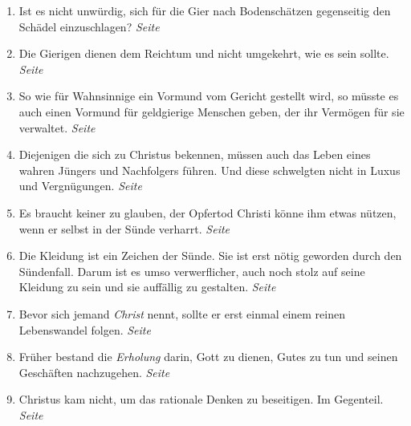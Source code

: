\begin{enumerate}
 \item Ist es nicht unwürdig, sich für die Gier nach Bodenschätzen
gegenseitig den Schädel einzuschlagen?
 \dotfill \textit{Seite~\pageref{ref:13_21_Kapitalisten_kritik}}\\

 \item Die Gierigen dienen dem Reichtum und nicht umgekehrt, wie es sein sollte.
 \dotfill \textit{Seite~\pageref{ref:13_21_Kapitalisten_dienerschaft}}\\

 \item So wie für Wahnsinnige ein Vormund vom Gericht gestellt wird, so
müsste es auch einen Vormund für geldgierige Menschen geben, der ihr Vermögen für
sie verwaltet.
 \dotfill \textit{Seite~\pageref{ref:13_22_wahnsinnige}}\\

 \item Diejenigen die sich zu Christus bekennen, müssen auch das Leben eines
wahren Jüngers und Nachfolgers führen. Und diese schwelgten nicht in Luxus und
Vergnügungen.
 \dotfill \textit{Seite~\pageref{ref:14_01_wahre_nachfolger}}\\

 \item Es braucht keiner zu glauben, der Opfertod Christi könne ihm etwas
nützen, wenn er selbst in der Sünde verharrt.
 \dotfill \textit{Seite~\pageref{ref:14_01_wahre_nachfolger_suenetod}}\\

 \item Die Kleidung ist ein Zeichen der Sünde. Sie ist erst nötig geworden durch
den Sündenfall. Darum ist es umso verwerflicher, auch noch stolz auf seine
Kleidung zu sein und sie auffällig zu gestalten.
 \dotfill \textit{Seite~\pageref{ref:14_04_wahre_nachfolger_kleidung}}\\

 \item Bevor sich jemand \textit{Christ} nennt, sollte er erst einmal einem reinen
Lebenswandel folgen.
 \dotfill \textit{Seite~\pageref{ref:14_06_wahre_nachfolger_umkehr}}\\

 \item Früher bestand die \textit{Erholung} darin, Gott zu dienen, Gutes zu tun
und seinen Geschäften nachzugehen.
 \dotfill \textit{Seite~\pageref{ref:14_07_wahre_nachfolger_erholung}}\\

 \item Christus kam nicht, um das rationale Denken zu beseitigen. Im Gegenteil.
 \dotfill \textit{Seite~\pageref{ref:14_08_wahre_nachfolger_rational}}\\


\end{enumerate}
